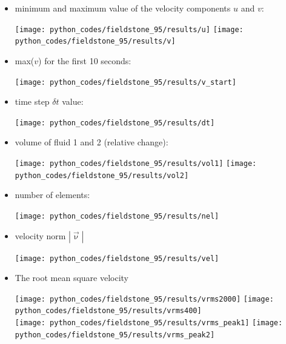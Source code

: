 \begin{itemize}
\item minimum and maximum value of the velocity components $u$ and $v$:

\begin{center}
\texttt{[image: python\_codes/fieldstone\_95/results/u]}
\texttt{[image: python\_codes/fieldstone\_95/results/v]}\\
\end{center}

\item max($v$) for the first 10 seconds:

\begin{center}
\texttt{[image: python\_codes/fieldstone\_95/results/v\_start]}
\end{center}

\item time step $\delta t$ value: 

\begin{center}
\texttt{[image: python\_codes/fieldstone\_95/results/dt]}
\end{center}

\item volume of fluid 1 and 2 (relative change):

\begin{center}
\texttt{[image: python\_codes/fieldstone\_95/results/vol1]}
\texttt{[image: python\_codes/fieldstone\_95/results/vol2]}
\end{center}

\item number of elements: 

\begin{center}
\texttt{[image: python\_codes/fieldstone\_95/results/nel]}
\end{center}

\item velocity norm $|\vec\upnu|$
 
\begin{center}
\texttt{[image: python\_codes/fieldstone\_95/results/vel]}
\end{center}

\item The root mean square velocity

\begin{center}
\texttt{[image: python\_codes/fieldstone\_95/results/vrms2000]}
\texttt{[image: python\_codes/fieldstone\_95/results/vrms400]}\\
\texttt{[image: python\_codes/fieldstone\_95/results/vrms\_peak1]}
\texttt{[image: python\_codes/fieldstone\_95/results/vrms\_peak2]}\\
\end{center}


\end{itemize}
